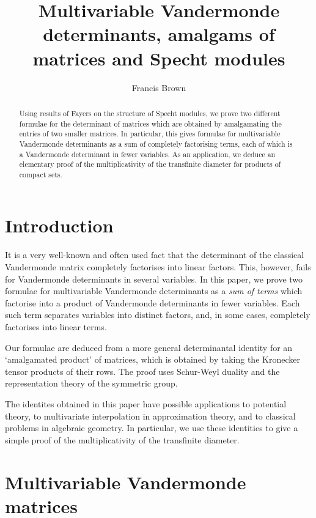 \documentclass[10pt]{amsart}
\theoremstyle{definition}
\theoremstyle{remark}
\numberwithin{equation}{section}
\newcommand{\0}{\color{blue}{\mathsf{0}}}
\begin{document}
\title{Multivariable Vandermonde determinants, amalgams of matrices  and  Specht modules}
\author{Francis Brown}
\maketitle

\begin{abstract} Using results of Fayers on the structure of Specht modules, we prove two different formulae for the determinant of   matrices which are obtained by amalgamating the entries of two smaller matrices. In particular,  this gives formulae for multivariable Vandermonde determinants as a sum of completely factorising terms, each of which is a Vandermonde determinant in fewer variables.  As an application, we deduce  an elementary proof of the multiplicativity of the transfinite diameter for products of compact sets. 
\end{abstract}


\section{Introduction}
It is a very well-known and  often used fact that the determinant of the  classical Vandermonde matrix completely factorises into linear factors. This, however, fails  for Vandermonde determinants in several variables. In this paper, we prove two formulae for  multivariable Vandermonde determinants  as a \emph{sum  of terms}   which factorise into a product of Vandermonde determinants in fewer variables.  Each such term  separates variables into distinct factors,  and, in some cases, completely factorises  into linear terms.

Our formulae are deduced from  a more general determinantal identity for an `amalgamated product' of matrices, which is obtained by taking the Kronecker tensor products of their rows.  The proof uses  Schur-Weyl duality and the representation theory of the symmetric group. 

The identites obtained in this paper have  possible applications  to  potential theory, to multivariate interpolation in approximation  theory, and to classical problems in algebraic geometry.
In particular, we use these identities to give a simple proof of the multiplicativity of the transfinite diameter.


\section{Multivariable Vandermonde matrices} \label{sect: MultivariableVDM}
\end{document}
